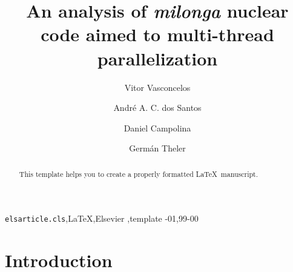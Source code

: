 \documentclass[review]{elsarticle}
\begin{document}
\begin{frontmatter}

  \title{An analysis of \textit{milonga} nuclear code aimed to multi-thread parallelization}
  

\author[mycorrespondingauthor]{Vitor Vasconcelos}%

\author{Andr\'e A. C. dos Santos}
\author{Daniel Campolina}                                
\address{Centro de Desenvolvimento da Tecnologia Nuclear (CDTN) - CEP 31270-901,
Belo Horizonte - MG, Brazil}


\author{Germ\'an Theler}%
\address{Seamplex, Rafaela, Argentina}




\begin{abstract}
This template helps you to create a properly formatted \LaTeX\ manuscript.
\end{abstract}

\begin{keyword}
\texttt{elsarticle.cls}\sep \LaTeX\sep Elsevier \sep template
-01\sep  99-00
\end{keyword}

\end{frontmatter}



\section{Introduction}
\end{document}
